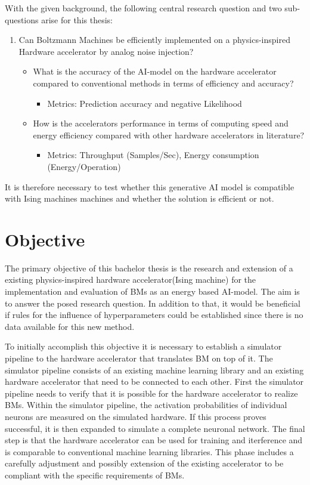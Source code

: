 With the given background, the following central research question and two sub-questions arise for this thesis:
\begin{enumerate}
    \item Can Boltzmann Machines be efficiently implemented on a physics-inspired Hardware accelerator by analog noise injection?
        \begin{itemize}
            \item What is the accuracy of the AI-model on the hardware accelerator compared to conventional methods in terms of efficiency and accuracy?
                \begin{itemize}
                    \item Metrics: Prediction accuracy and negative Likelihood
                \end{itemize}
            \item How is the accelerators performance in terms of computing speed and energy efficiency compared with other hardware accelerators in literature?
                \begin{itemize}
                    \item Metrics: Throughput (Samples/Sec), Energy consumption (Energy/Operation)
                \end{itemize}
        \end{itemize}  
\end{enumerate}

It is therefore necessary to test whether this generative AI model is compatible with Ising machines
machines and whether the solution is efficient or not.


\section{Objective}

The primary objective of this bachelor thesis is the research and extension of a existing physics-inspired
hardware accelerator(Ising machine) for the implementation and evaluation of \ac{BM}s as an energy based 
AI-model. The aim is to answer the posed research question. 
In addition to that, it would be beneficial if rules for the influence of hyperparameters could be established
since there is no data available for this new method.

To initially accomplish this objective it is necessary to establish a simulator pipeline to the
hardware accelerator that translates \ac{BM} on top of it.
The simulator pipeline consists of an existing machine learning library and an existing hardware accelerator
that need to be connected to each other.
First the simulator pipeline needs to verify that it is possible for the hardware accelerator
to realize \ac{BM}s. 
Within the simulator pipeline, the activation probabilities of individual neurons are measured on the simulated hardware.
If this process proves successful, it is then expanded to simulate a complete neuronal network.
The final step is that the hardware accelerator can be used for training and iterference
and is comparable to conventional machine learning libraries.
This phase includes a carefully adjustment and possibly extension of the existing accelerator to be compliant 
with the specific requirements of \ac{BM}s.

